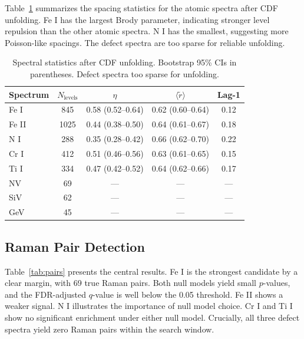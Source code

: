\documentclass[11pt,a4paper]{article}
\begin{document}
Table~\ref{tab:spectral} summarizes the spacing statistics for the atomic spectra after CDF unfolding. Fe I has the largest Brody parameter, indicating stronger level repulsion than the other atomic spectra. N I has the smallest, suggesting more Poisson-like spacings. The defect spectra are too sparse for reliable unfolding.

\begin{table}[t]
\centering
\caption{Spectral statistics after CDF unfolding. Bootstrap 95\% CIs in parentheses. Defect spectra too sparse for unfolding.}
\label{tab:spectral}
\small
\setlength{\tabcolsep}{4pt}
\begin{tabular}{@{}lcccc@{}}
\toprule
Spectrum & $N_{\mathrm{levels}}$ & $\eta$ & $\langle \tilde{r} \rangle$ & Lag-1 \\
\midrule
Fe I  & 845 & 0.58 (0.52--0.64) & 0.62 (0.60--0.64) & 0.12 \\
Fe II & 1025 & 0.44 (0.38--0.50) & 0.64 (0.61--0.67) & 0.18 \\
N I   & 288 & 0.35 (0.28--0.42) & 0.66 (0.62--0.70) & 0.22 \\
Cr I  & 412 & 0.51 (0.46--0.56) & 0.63 (0.61--0.65) & 0.15 \\
Ti I  & 334 & 0.47 (0.42--0.52) & 0.64 (0.62--0.66) & 0.17 \\
NV    & 69  & --- & --- & --- \\
SiV   & 62  & --- & --- & --- \\
GeV   & 45  & --- & --- & --- \\
\bottomrule
\end{tabular}
\end{table}

\subsection{Raman Pair Detection}
\label{sec:ramanresults}

Table~\ref{tab:pairs} presents the central results. Fe I is the strongest candidate by a clear margin, with 69 true Raman pairs. Both null models yield small $p$-values, and the FDR-adjusted $q$-value is well below the 0.05 threshold. Fe II shows a weaker signal. N I illustrates the importance of null model choice. Cr I and Ti I show no significant enrichment under either null model. Crucially, all three defect spectra yield zero Raman pairs within the search window.
\end{document}
